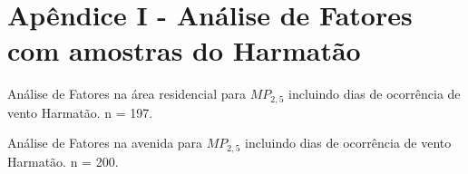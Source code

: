 \section{Apêndice I - Análise de Fatores com amostras do Harmatão}

\begin{table}[H]
  \centering
  
  \caption{Análise de Fatores na área residencial para $MP_{2,5}$
          incluindo dias de ocorrência de vento Harmatão. n = 197.
          \label{table:AF_RFsH5}}
\end{table}

\begin{table}[H]
  \centering
  
  \caption{Análise de Fatores na avenida para $MP_{2,5}$
           incluindo dias de ocorrência de vento Harmatão. n = 200.
          \label{table:AF_TFsH5}}
\end{table}
